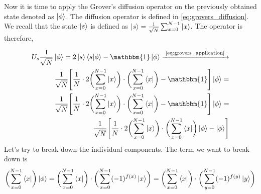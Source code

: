 Now it is time to apply the Grover's diffusion operator on the previously obtained state denoted as $\ket{\phi}$.
The diffusion operator is defined in \autoref{eq:grovers_diffusion}. We recall that the state $\ket{s}$ is defined as 
$\ket{s} = \frac{1}{\sqrt{N}}\sum_{x=0}^{N-1} \ket{x}$.
The operator is therefore, 

\begin{equation}
  \begin{split}
    U_s \frac{1}{\sqrt{N}}\ket{\phi} = 2\ket{s}\bra{s} \ket{\phi} - \mathbbm{1}\ket{\phi} \xrightarrow{\text{ \autoref{eq:grovers_application} }} \\
    \frac{1}{\sqrt{N}}\Biggl[\frac{1}{N}\cdot 2\biggl( \sum_{x=0}^{N-1}\ket{x} \biggr)\cdot \biggl( \sum_{x=0}^{N-1} \bra{x}  \biggr) - \mathbbm{1} \Biggr] \ket{\phi} = \\
    \frac{1}{\sqrt{N}}\Biggl[\frac{1}{N}\cdot 2\biggl( \sum_{x=0}^{N-1}\ket{x} \biggr)\cdot \biggl( \sum_{x=0}^{N-1} \bra{x} \biggr) - \mathbbm{1} \Biggr] \ket{\phi} = \\
    \frac{1}{\sqrt{N}}\Biggl[\frac{1}{N}\cdot 2 \biggl( \sum_{x=0}^{N-1}\ket{x}\biggr)\cdot \biggl( \sum_{x=0}^{N-1} \bra{x} \biggr)\ket{\phi} - \ket{\phi }\Biggr]  
  \end{split}
  \label{eq:grovers_apply_diffusion}
\end{equation}
Let's try to break down the individual components.
The term we want to break down is 
\begin{gather}
  \biggl( \sum_{x=0}^{N-1} \bra{x} \biggr)\ket{\phi} = \biggl( \sum_{x=0}^{N-1} \bra{x} \biggr)\cdot \biggl( \sum_{x=0}^{N-1}(-1)^{f(x)}\ket{x} \biggr) = \biggl( \sum_{x=0}^{N-1} \bra{x} \biggr)\cdot \biggl( \sum_{y=0}^{N-1}(-1)^{f(y)}\ket{y} \biggr)
\end{gather}

